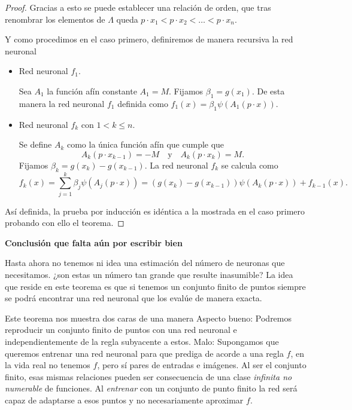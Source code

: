 \begin{proof}
Gracias a esto se puede establecer una relación de orden, que tras 
renombrar los elementos de $\Lambda$ queda
 $p \cdot x_1 < p \cdot x_2 < \ldots < p \cdot x_n.$

 Y como procedimos en el caso primero, definiremos de manera
 recursiva la red neuronal

 \begin{itemize}
 \item Red neuronal $f_1$. 

Sea $A_1$ la función afín constante $A_1 = M.$
Fijamos $\beta_1 = g(x_1)$. 
De esta manera la red neuronal $f_1$ 
definida como $f_1(x) = \beta_1 \psi(A_1(p \cdot x)).$

\item Red neuronal $f_k$ con $1 < k \leq n$. 

Se define $A_{k}$ como la única función afín que cumple que 
\begin{equation}
    A_k(p \cdot x_{k-1}) = -M 
    \quad \text{y} \quad 
     A_{k}(p \cdot x_k)= M.
\end{equation}
Fijamos $\beta_k = g(x_k) - g(x_{k-1})$. 
La red neuronal $f_k$ se calcula como 
\begin{equation}
    f_k(x) 
    = 
    \sum_{j=1}^k \beta_j \psi(A_j(p \cdot x))
     = 
    (g(x_k)-g(x_{k-1})) \psi(A_k(p \cdot x)) + f_{k-1}(x) .  
\end{equation}
\end{itemize}

Así definida, la prueba por inducción es idéntica a la mostrada 
en el caso primero probando con ello el teorema.

\end{proof}

\textbf{Conclusión que falta aún por escribir bien}

Hasta ahora no tenemos ni idea una estimación del número de 
neuronas que necesitamos.  ¿son estas un número tan grande que 
resulte inasumible?
La idea que reside en este teorema es que si tenemos un conjunto
finito de puntos siempre se podrá encontrar una red neuronal 
que los evalúe de manera exacta. 

Este teorema nos muestra dos caras de una manera 
Aspecto bueno: 
Podremos reproducir un conjunto finito de puntos con una red neuronal e independientemente de la regla subyacente a estos. 
Malo: 
Supongamos que queremos entrenar una red neuronal para que prediga 
de acorde a una regla $f$, en la vida real no tenemos $f$, pero sí
pares de entradas e imágenes. Al ser el conjunto finito, 
esas mismas relaciones pueden ser consecuencia de una clase 
\textit{infinita no numerable} de funciones. 
Al \textit{entrenar} con un conjunto de punto finito  la red será capaz de adaptarse  a esos puntos y no 
necesariamente aproximar $f$. 

